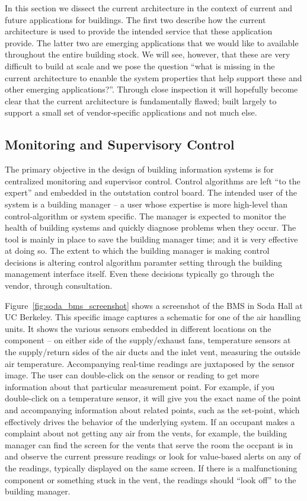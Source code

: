 In this section we dissect the current architecture in the context of current and future applications
for buildings.  The first two describe how the current architecture is used to provide the intended service
that these application provide.  The latter two are emerging applications that we would like to available
throughout the entire building stock.  We will see, however, that these are very difficult to build at scale
and we pose the question ``what is missing in the current architecture to enanble the system properties that help
support these and other emerging applications?''.  Through close inspection it will hopefully become clear that
the current architecture is fundamentally flawed; built largely to support a small set of vendor-specific
applications and not much else.

\subsection{Monitoring and Supervisory Control}
The primary objective in the design of building information systems is for centralized monitoring and supervisor
control.  Control algorithms are left ``to the expert'' and embedded in the outstation control board.  The intended
user of the system is a building manager -- a user whose expertise is more high-level than control-algorithm or system specific.
The manager is expected to monitor the health of building systems and quickly diagnose problems when they occur.  The tool
is mainly in place to save the building manager time; and it is very effective at doing so.  The extent to which 
the building manager is making control decisions is altering control algorithm paramter setting through
the building management interface itself.  Even these decisions typically go through the vendor, through consultation.

Figure~\ref{fig:soda_bms_screenshot} shows a screenshot of the BMS in Soda Hall at UC Berkeley.  This specific image
captures a schematic for one of the air handling units.  It shows the various sensors embedded in different locations
on the component -- on either side of the supply/exhaust fans, temperature sensors at the supply/return sides of the
air ducts and the inlet vent, measuring the outside air temperature.  Accompanying real-time readings are juxtaposed
by the sensor image.  The user can double-click on the sensor or reading to get more information about that particular 
measurement point.  For example, if you double-click on a temperature sensor, it will give you the exact name of the 
point and accompanying information about related points, such as the set-point, which effectively drives the behavior of 
the underlying system.  If an occupant makes a complaint about not getting any air from the vents, for example, the 
building manager can find the screen for the vents that serve the room the occpant is in and observe the current
pressure readings or look for value-based alerts on any of the readings, typically displayed on the same screen.
If there is a malfunctioning component or something stuck in the vent, the readings should ``look off'' to the building 
manager.

